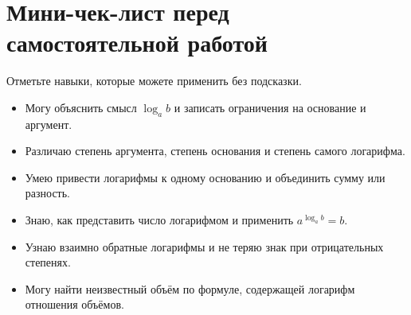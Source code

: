 \documentclass[a4paper,11pt]{article}
\begin{document}
\section*{Мини-чек-лист перед самостоятельной работой}
Отметьте навыки, которые можете применить без подсказки.
\begin{itemize}[label=$\square$,leftmargin=8mm,itemsep=5pt]
\item Могу объяснить смысл \(\log_a b\) и записать ограничения на основание и аргумент.
\item Различаю степень аргумента, степень основания и степень самого логарифма.
\item Умею привести логарифмы к одному основанию и объединить сумму или разность.
\item Знаю, как представить число логарифмом и применить \(a^{\log_a b}=b\).
\item Узнаю взаимно обратные логарифмы и не теряю знак при отрицательных степенях.
\item Могу найти неизвестный объём по формуле, содержащей логарифм отношения объёмов.
\end{itemize}

\clearpage
\end{document}

